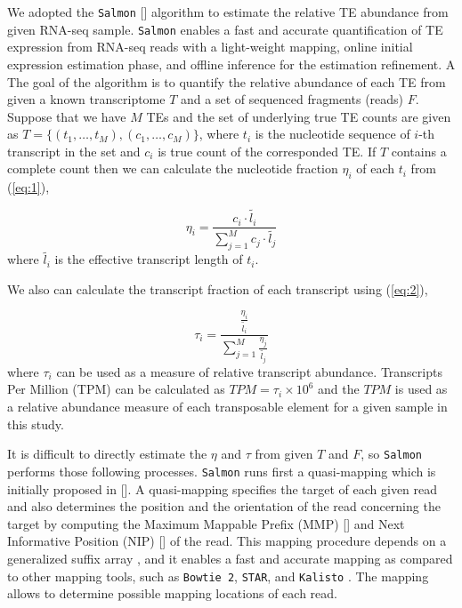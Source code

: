 \documentclass[wsdraft]{ws-procs11x85}
\begin{document}
We adopted the \texttt{Salmon} [] algorithm to estimate the relative TE abundance from given RNA-seq sample. \texttt{Salmon} enables a fast and accurate quantification of TE expression from RNA-seq reads with a light-weight mapping, online initial expression estimation phase, and offline inference for the estimation refinement.\cite{patro2017salmon,srivastava2016rapmap,bishop2006pattern,foulds2013stochastic} 
A The goal of the algorithm is to quantify the relative abundance of each TE from given a known transcriptome $T$ and a set of sequenced fragments (reads) $F$.
Suppose that we have $M$ TEs and the set of underlying true TE counts are given as $T = \{(t_1, \dots , t_M), (c_1, \dots, c_M) \}$, where $t_i$ is the nucleotide sequence of $i$-th transcript in the set and $c_i$ is true count of the corresponded TE. If $T$ contains a complete count then we can calculate the nucleotide fraction $\eta_i$ of each $t_i$ from (\ref{eq:1}),

\begin{equation} \label{eq:1}
\eta_i = \frac{c_i \cdot \widetilde{l_i} }{\sum_{j=1}^{M} c_j \cdot \widetilde{l_j}}
\end{equation}
where $\widetilde{l_i}$ is the effective transcript length of $t_i$\cite{li2009rna}.

We also can calculate the transcript fraction of each transcript using (\ref{eq:2}),

\begin{equation} \label{eq:2}
\tau_i = \frac{ \frac{\eta_i }{\widetilde{l_i}} }
{\sum_{j=1}^{M} \frac{\eta_j }{\widetilde{l_j}} }
\end{equation}
where $\tau_i$ can be used as a measure of relative transcript abundance. Transcripts Per Million (TPM) can be calculated as $TPM=\tau_i \times 10^6$ and the $TPM$ is used as a relative abundance measure of each transposable element for a given sample in this study. 

It is difficult to directly estimate the $\eta$ and $\tau$ from given $T$ and $F$, so \texttt{Salmon} performs those following processes.
\texttt{Salmon} runs first a quasi-mapping which is initially proposed in []. A quasi-mapping specifies the target of each given read and also determines the position and the orientation of the read concerning the target by computing the
Maximum Mappable Prefix (MMP) [] and Next Informative Position (NIP) [] of the read.
This mapping procedure depends on a generalized suffix array \cite{manber1993suffix},  and it enables a fast and accurate mapping as compared to other mapping tools, such as \texttt{Bowtie 2}, \texttt{STAR}, and \texttt{Kalisto} \cite{srivastava2016rapmap}. The mapping allows to determine possible mapping locations of each read.
\end{document}
